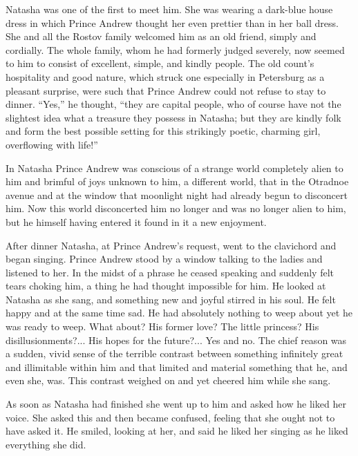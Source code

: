 Natasha was one of the first to meet him. She was wearing a
dark-blue house dress in which Prince Andrew thought her even
prettier than in her ball dress. She and all the Rostov family
welcomed him as an old friend, simply and cordially. The whole
family, whom he had formerly judged severely, now seemed to him
to consist of excellent, simple, and kindly people. The old
count's hospitality and good nature, which struck one especially
in Petersburg as a pleasant surprise, were such that Prince
Andrew could not refuse to stay to dinner. ``Yes,'' he thought,
``they are capital people, who of course have not the slightest
idea what a treasure they possess in Natasha; but they are kindly
folk and form the best possible setting for this strikingly
poetic, charming girl, overflowing with life!''

In Natasha Prince Andrew was conscious of a strange world
completely alien to him and brimful of joys unknown to him, a
different world, that in the Otradnoe avenue and at the window
that moonlight night had already begun to disconcert him. Now
this world disconcerted him no longer and was no longer alien to
him, but he himself having entered it found in it a new
enjoyment.

After dinner Natasha, at Prince Andrew's request, went to the
clavichord and began singing. Prince Andrew stood by a window
talking to the ladies and listened to her. In the midst of a
phrase he ceased speaking and suddenly felt tears choking him, a
thing he had thought impossible for him. He looked at Natasha as
she sang, and something new and joyful stirred in his soul. He
felt happy and at the same time sad. He had absolutely nothing to
weep about yet he was ready to weep. What about?  His former
love? The little princess? His disillusionments?... His hopes for
the future?... Yes and no. The chief reason was a sudden, vivid
sense of the terrible contrast between something infinitely great
and illimitable within him and that limited and material
something that he, and even she, was. This contrast weighed on
and yet cheered him while she sang.

As soon as Natasha had finished she went up to him and asked how
he liked her voice. She asked this and then became confused,
feeling that she ought not to have asked it. He smiled, looking
at her, and said he liked her singing as he liked everything she
did.

